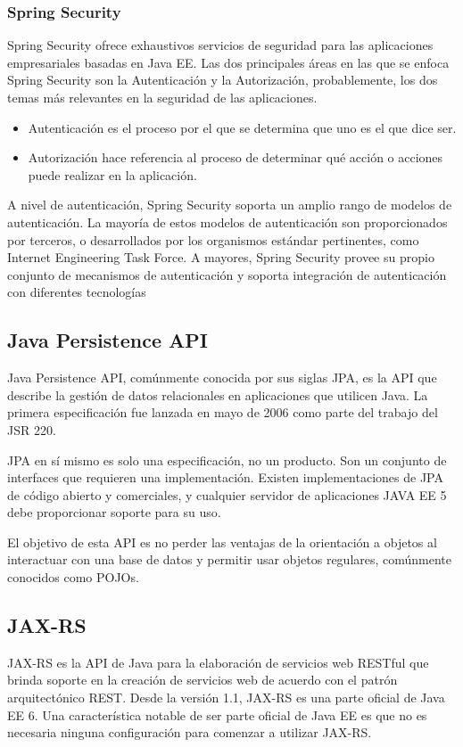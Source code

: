 \subsubsection*{Spring Security}
Spring Security ofrece exhaustivos servicios de seguridad para las aplicaciones empresariales basadas en Java EE. 
Las dos principales áreas en las que se enfoca Spring Security son la Autenticación y la Autorización, probablemente, los dos temas más relevantes en la seguridad de las aplicaciones.
	\begin{itemize}
		\item Autenticación es el proceso por el que se determina que uno es el que dice ser.
		\item Autorización hace referencia al proceso de determinar qué acción o acciones puede realizar en la aplicación.
	\end{itemize}
	
A nivel de autenticación, Spring Security soporta un amplio rango de modelos de autenticación. La mayoría de estos modelos de autenticación son proporcionados por terceros, o desarrollados por los organismos estándar pertinentes, como Internet Engineering Task Force. A mayores, Spring Security provee su propio conjunto de mecanismos de autenticación y soporta integración de autenticación con diferentes tecnologías


\subsection{Java Persistence API}
Java Persistence API, comúnmente conocida por sus siglas JPA, es la API que describe la gestión de datos relacionales en aplicaciones que utilicen Java. La primera especificación fue lanzada en mayo de 2006 como parte del trabajo del JSR 220.

JPA en sí mismo es solo una especificación, no un producto. Son un conjunto de interfaces que requieren una implementación. Existen implementaciones de JPA de código abierto y comerciales, y cualquier servidor de aplicaciones JAVA EE 5 debe proporcionar soporte para su uso.

El objetivo de esta API es no perder las ventajas de la orientación a objetos al interactuar con una base de datos y permitir usar objetos regulares, comúnmente conocidos como POJOs. 

\subsection{JAX-RS}
JAX-RS es la API de Java para la elaboración de servicios web RESTful que brinda soporte en la creación de servicios web de acuerdo con el patrón arquitectónico REST. Desde la versión 1.1, JAX-RS es una parte oficial de Java EE 6. Una característica notable de ser parte oficial de Java EE es que no es necesaria ninguna configuración para comenzar a utilizar JAX-RS.

